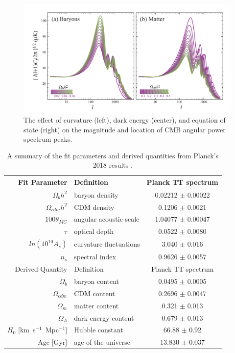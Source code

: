 \begin{figure}[htbp]
\begin{center}
\includegraphics[width=\textwidth]{figures/theory/matter_baryons.png}
\caption{The effect of curvature (left), dark energy (center), and equation of state (right) on the magnitude and location of \ac{CMB} angular power spectrum peaks.  \cite{Hu2008} }
\label{fig:curve_etc.}
\end{center}
\end{figure}


\begin{table}[htp]
\caption{A summary of the fit parameters and derived quantities from Planck's 2018 results \cite{Planck208}.}
\begin{center}
\begin{tabular}{ r l c }
\hline
Fit Parameter & Definition &  Planck TT spectrum \\
\hline
$\Omega_{b}h^{2}$ & baryon density & 0.02212 $\pm$ 0.00022 \\
$\Omega_{cdm}h^{2}$ & CDM density & 0.1206 $\pm$ 0.0021 \\
$100\theta_{MC}$ & angular acoustic scale & 1.04077 $\pm$ 0.00047 \\
$\tau$ & optical depth & 0.0522 $\pm$ 0.0080 \\
$ln(10^{10}A_{s})$ & curvature fluctuations & 3.040 $\pm$ 0.016 \\
$n_{s}$ & spectral index & 0.9626 $\pm$ 0.0057 \\
\hline
Derived Quantity & Definition &  Planck TT spectrum \\
\hline
$\Omega_{b}$ & baryon content & 0.0495 $\pm$ 0.0005 \\
$\Omega_{cdm}$ & CDM content & 0.2696 $\pm$ 0.0047 \\
$\Omega_{m}$  & matter content & 0.321 $\pm$ 0.013 \\
$\Omega_{\Lambda}$  & dark energy content & 0.679 $\pm$ 0.013 \\
$H_{0}$ [km~s$^{-1}$~Mpc$^{-1}$] & Hubble constant & 66.88 $\pm$ 0.92 \\
Age [Gyr]  & age of the universe & 13.830 $\pm$  0.037 \\

\end{tabular}
\end{center}
\label{default}
\end{table}%



